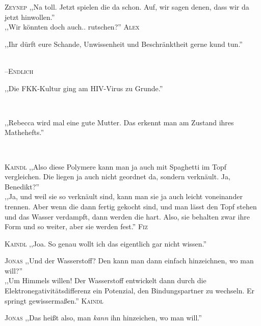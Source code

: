 \vspace{3mm}
\hangindent=0.7cm
\raggedright \textsc{\footnotesize Zeynep} ,,Na toll. Jetzt spielen die da schon. Auf, wir sagen denen, dass wir da jetzt hinwollen.''\\
\raggedleft ,,Wir könnten doch auch.. rutschen?'' \textsc{\footnotesize Alex}\\

\vspace{3mm}
{\raggedright ,,Ihr dürft eure Schande, Unwissenheit und Beschränktheit gerne kund tun.''}\\
\raggedleft \textsc{\footnotesize --\/Endlich}\\

\vspace{3mm}
{\raggedright ,,Die FKK-Kultur ging am HIV-Virus zu Grunde.''}\\

\vspace{3mm}
{\raggedright ,,Rebecca wird mal eine gute Mutter. Das erkennt man am Zustand ihres Mathehefts.''}\\

\vspace{3mm}
\hangindent=0.7cm
\raggedright \textsc{\footnotesize Kaindl} ,,Also diese Polymere kann man ja auch mit Spaghetti im Topf vergleichen. Die liegen ja auch nicht geordnet da, sondern verknäult. Ja, Benedikt?''\\
\raggedleft ,,Ja, und weil sie so verknäult sind, kann man sie ja auch leicht voneinander trennen. Aber wenn die dann fertig gekocht sind, und man lässt den Topf stehen und das Wasser verdampft, dann werden die hart. Also, sie behalten zwar ihre Form und so weiter, aber sie werden fest.'' \textsc{\footnotesize Fiz}\\
\hangindent=0.7cm
\raggedright \textsc{\footnotesize Kaindl} ,,Joa. So genau wollt ich das eigentlich gar nicht wissen.''\\

\vspace{3mm}
\hangindent=0.7cm
\raggedright \textsc{\footnotesize Jonas} ,,Und der Wasserstoff? Den kann man dann einfach hinzeichnen, wo man will?''\\
\raggedleft ,,Um Himmels willen! Der Wasserstoff entwickelt dann durch die Elektronegativitätsdifferenz ein Potenzial, den Bindungspartner zu wechseln. Er springt gewissermaßen.'' \textsc{\footnotesize Kaindl}\\
\hangindent=0.7cm
\raggedright \textsc{\footnotesize Jonas} ,,Das heißt also, man \emph{kann} ihn hinzeichen, wo man will.''\\

